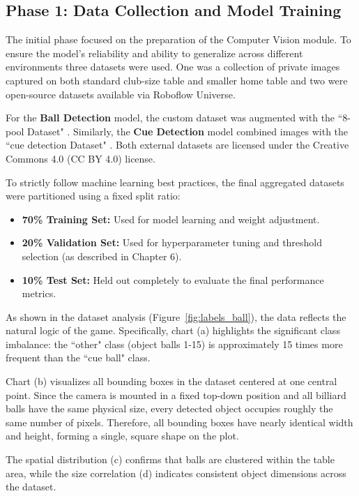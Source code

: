 \subsection{Phase 1: Data Collection and Model Training}
The initial phase focused on the preparation of the Computer Vision module. To ensure the model's reliability and ability to generalize across different environments three datasets were used. One was a collection of private images captured on both standard club-size table and smaller home table and two were open-source datasets available via Roboflow Universe.

For the \textbf{Ball Detection} model, the custom dataset was augmented with the ``8-pool Dataset" \cite{bib:8-pool_dataset}. Similarly, the \textbf{Cue Detection} model combined images with the ``cue detection Dataset" \cite{bib:cue-detection_dataset}. Both external datasets are licensed under the Creative Commons 4.0 (CC BY 4.0) license.

To strictly follow machine learning best practices, the final aggregated datasets were partitioned using a fixed split ratio:
\begin{itemize}
    \item \textbf{70\% Training Set:} Used for model learning and weight adjustment.
    \item \textbf{20\% Validation Set:} Used for hyperparameter tuning and threshold selection (as described in Chapter 6).
    \item \textbf{10\% Test Set:} Held out completely to evaluate the final performance metrics.
\end{itemize}

As shown in the dataset analysis (Figure~\ref{fig:labels_ball}), the data reflects the natural logic of the game. Specifically, chart (a) highlights the significant class imbalance: the ``other" class (object balls 1-15) is approximately 15 times more frequent than the ``cue ball" class.

Chart (b) visualizes all bounding boxes in the dataset centered at one central point. Since the camera is mounted in a fixed top-down position and all billiard balls have the same physical size, every detected object occupies roughly the same number of pixels. Therefore, all bounding boxes have nearly identical width and height, forming a single, square shape on the plot.

The spatial distribution (c) confirms that balls are clustered within the table area, while the size correlation (d) indicates consistent object dimensions across the dataset.

